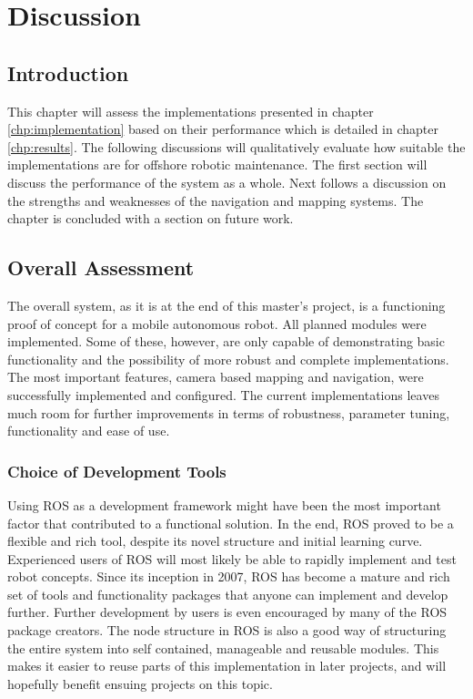 \chapter{Discussion}
\label{chp:discussion} 

\section{Introduction}

This chapter will assess the implementations presented in chapter \ref{chp:implementation} based on their performance which is detailed in chapter \ref{chp:results}. The following discussions will qualitatively evaluate how suitable the implementations are for offshore robotic maintenance. The first section will discuss the performance of the system as a whole. Next follows a discussion on the strengths and weaknesses of the navigation and mapping systems. The chapter is concluded with a section on future work. 

\section{Overall Assessment}

The overall system, as it is at the end of this master's project, is a functioning proof of concept for a mobile autonomous robot. All planned modules were implemented. Some of these, however, are only capable of demonstrating basic functionality and the possibility of more robust and complete implementations. The most important features, camera based mapping and navigation, were successfully implemented and configured. The current implementations leaves much room for further improvements in terms of robustness, parameter tuning, functionality and ease of use.

\subsection{Choice of Development Tools}

Using \ac{ROS} as a development framework might have been the most important factor that contributed to a functional solution. In the end, \ac{ROS} proved to be a flexible and rich tool, despite its novel structure and initial learning curve. Experienced users of \ac{ROS} will most likely be able to rapidly implement and test robot concepts.  Since its inception in 2007, \ac{ROS} has become a mature and rich set of tools and functionality packages that anyone can implement and develop further. Further development by users is even encouraged by many of the \ac{ROS} package creators. The node structure in \ac{ROS} is also a good way of structuring the entire system into self contained, manageable and reusable modules. This makes it easier to reuse parts of this implementation in later projects, and will hopefully benefit ensuing projects on this topic.

